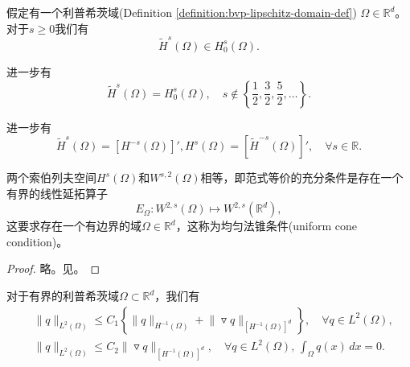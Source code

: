\begin{theorem}
  假定有一个利普希茨域(Definition \ref{definition:bvp-lipschitz-domain-def}) $\Omega \in \mathbb{R}^d$。对于$s \ge 0$我们有
  \begin{equation*}
    \widetilde{H}^{s}(\Omega) \in H_0^s(\Omega).
  \end{equation*}

  进一步有
  \begin{equation*}
    \widetilde{H}^{s}(\Omega) = H_0^s(\Omega), \quad s \notin \left\{ \frac{1}{2}, \frac{3}{2}, \frac{5}{2}, \ldots \right\}.
  \end{equation*}

  进一步有
  \begin{equation*}
    \widetilde{H}^{s}(\Omega) = \left[ H^{-s} (\Omega) \right]',
    H^s(\Omega) = \left[ \widetilde{H}^{-s}(\Omega) \right]', \quad \forall s \in \mathbb{R}.
  \end{equation*}
\end{theorem}

\begin{definition}[均匀法锥条件]
\label{definition:uniform-cone-condition}
两个索伯列夫空间$H^s(\Omega)$和$W^{s,2}(\Omega)$相等，即范式等价的充分条件是存在一个有界的线性延拓算子
\begin{equation*}
  E_{\Omega} : W^{2,s}(\Omega) \mapsto W^{2,s}(\mathbb{R}^d),
\end{equation*}
这要求存在一个有边界的域$\Omega \in \mathbb{R}^d$，这称为均匀法锥条件(uniform cone condition)。
\end{definition}
\begin{proof}
  略。见\cite[Theorem 4.6, 4.7]{Adams:2003wi}。
\end{proof}

\begin{theorem}
  对于有界的利普希茨域$\Omega \subset \mathbb{R}^d$，我们有
  \begin{equation*}
    \begin{split}
      &\big\| q \big\|_{L^2(\Omega)} \le C_1
      \left\{
      \big\| q \big\|_{H^{-1}(\Omega)} + \big\| \triangledown q \big\|_{\left[ H^{-1}(\Omega) \right]^d }
      \right\}, \quad \forall q \in L^{2}(\Omega), \\
      & \big\| q \big\|_{L^2(\Omega)} \le C_2
      \big\| \triangledown q \big\|_{\left[ H^{-1}(\Omega)\right]^d}, \quad \forall q \in L^{2}(\Omega), \, \int_{\Omega} q(x) \, d x = 0.
    \end{split}
  \end{equation*}
\end{theorem}

